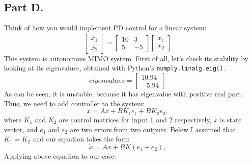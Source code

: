 \documentclass[a4paper,12pt]{article}
\begin{document}
    \subsection*{Part D.}
    Think of how you would implement PD control for a linear system:
    \begin{equation*}
        \begin{bmatrix}
            \dot{x_1}\\
            \dot{x_2}
        \end{bmatrix}
        = 
        \begin{bmatrix}
            10 & 3 \\
            5 & -5
        \end{bmatrix}
        \begin{bmatrix}
            x_1\\
            x_2
        \end{bmatrix}
    \end{equation*}
    This system is autonomous MIMO system. First of all, let's check its 
    stability by looking at its 
    eigenvalues, obtained with Python's \texttt{numply.linalg.eig()}.
    \begin{equation*}
        eigenvalues = 
        \begin{bmatrix}
            10.94\\
            -5.94
        \end{bmatrix}
    \end{equation*}
    As can be seen, it is unstable, because it has eigenvalue with positive
    real part. Thus, we need to add controller to the system:
    \begin{equation*}
        \dot{x} = Ax + BK_1e_1 + BK_2e_2,
    \end{equation*}
    where $K_1$ and $K_2$ are control matrices for input 1 and 2 respectively,
    $x$ is state vector, and $e_1$ and $e_2$ are two errors from two outputs. 
    Below I assumed that 
    $K_1 = K_2$ and our equation takes the form
    \begin{equation*}
        \dot{x} = Ax + BK(e_1 + e_2),
    \end{equation*}
    Applying above equation to our case:
\end{document}
